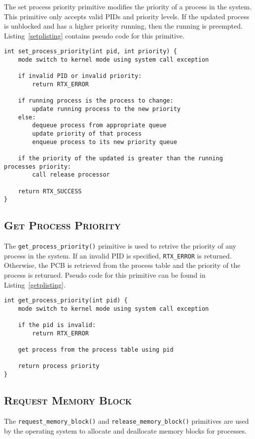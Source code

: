 \documentclass[oneside]{report}
\begin{document}
The set process priority primitive modifies the priority of a process
in the system. This primitive only accepts valid PIDs and priority
levels. If the updated process is unblocked and has a higher priority
running, then the running is preempted. Listing~\ref{setplisting}
contains pseudo code for this primitive.

\begin{lstlisting}
int set_process_priority(int pid, int priority) {
    mode switch to kernel mode using system call exception
    
    if invalid PID or invalid priority:
        return RTX_ERROR
    
    if running process is the process to change:
        update running process to the new priority
    else:
        dequeue process from appropriate queue
        update priority of that process
        enqueue process to its new priority queue

    if the priority of the updated is greater than the running processes priority:
        call release processor

    return RTX_SUCCESS
}
\end{lstlisting}

\subsection{\textsc{Get Process Priority}}
The \texttt{get\_process\_priority()} primitive is used to retrive the
priority of any process in the system. If an invalid PID is specified,
\texttt{RTX\_ERROR} is returned. Otherwise, the PCB is retrieved from
the process table and the priority of the process is returned. Pseudo
code for this primitive can be found in Listing~\ref{getplisting}.

\begin{lstlisting}
int get_process_priority(int pid) {
    mode switch to kernel mode using system call exception
    
    if the pid is invalid:
        return RTX_ERROR

    get process from the process table using pid
    
    return process priority
}
\end{lstlisting}

\subsection{\textsc{Request Memory Block}}
The \texttt{request\_memory\_block()} and \texttt{release\_memory\_block()}
primitives are used by the operating system to allocate and deallocate memory
blocks for processes.
\end{document}
